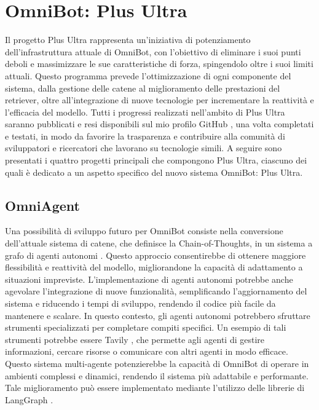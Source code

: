\chapter{OmniBot: Plus Ultra}
Il progetto Plus Ultra rappresenta un'iniziativa di potenziamento dell'infrastruttura attuale di OmniBot, con l'obiettivo di eliminare i suoi punti deboli e massimizzare le sue caratteristiche di forza, spingendolo oltre i suoi limiti attuali. Questo programma prevede l'ottimizzazione di ogni componente del sistema, dalla gestione delle catene al miglioramento delle prestazioni del retriever, oltre all'integrazione di nuove tecnologie per incrementare la reattività e l'efficacia del modello.
Tutti i progressi realizzati nell'ambito di Plus Ultra saranno pubblicati e resi disponibili sul mio profilo GitHub \cite{github}, una volta completati e testati, in modo da favorire la trasparenza e contribuire alla comunità di sviluppatori e ricercatori che lavorano su tecnologie simili. A seguire sono presentati i quattro progetti principali che compongono Plus Ultra, ciascuno dei quali è dedicato a un aspetto specifico del nuovo sistema OmniBot: Plus Ultra.

\section{OmniAgent}
Una possibilità di sviluppo futuro per OmniBot consiste nella conversione dell'attuale sistema di catene, che definisce la Chain-of-Thoughts, in un sistema a grafo di agenti autonomi \cite{Wang_2024,Besta_2024,yao2023treethoughtsdeliberateproblem,xi2023risepotentiallargelanguage,guo2024largelanguagemodelbased,shao2024assistingwritingwikipedialikearticles}. Questo approccio consentirebbe di ottenere maggiore flessibilità e reattività del modello, migliorandone la capacità di adattamento a situazioni impreviste. L'implementazione di agenti autonomi potrebbe anche agevolare l'integrazione di nuove funzionalità, semplificando l'aggiornamento del sistema e riducendo i tempi di sviluppo, rendendo il codice più facile da mantenere e scalare.
In questo contesto, gli agenti autonomi potrebbero sfruttare strumenti specializzati per completare compiti specifici. Un esempio di tali strumenti potrebbe essere Tavily \cite{tavily}, che permette agli agenti di gestire informazioni, cercare risorse o comunicare con altri agenti in modo efficace. Questo sistema multi-agente potenzierebbe la capacità di OmniBot di operare in ambienti complessi e dinamici, rendendo il sistema più adattabile e performante. Tale miglioramento può essere implementato mediante l'utilizzo delle librerie di LangGraph \cite{langgraph}.

